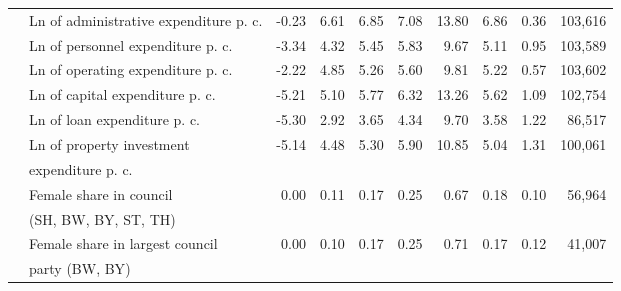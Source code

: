 \begin{tabular}{llrrrrrrrr}
  &Ln of administrative expenditure \acs{p. c.} & -0.23 & 6.61 & 6.85 & 7.08 & 13.80 & 6.86 & 0.36 & 103,616 \\ 
  &Ln of personnel expenditure \acs{p. c.} & -3.34 & 4.32 & 5.45 & 5.83 & 9.67 & 5.11 & 0.95 & 103,589 \\ 
  &Ln of operating expenditure \acs{p. c.} & -2.22 & 4.85 & 5.26 & 5.60 & 9.81 & 5.22 & 0.57 & 103,602 \\ 
  &Ln of capital expenditure \acs{p. c.} & -5.21 & 5.10 & 5.77 & 6.32 & 13.26 & 5.62 & 1.09 & 102,754 \\ 
  &Ln of loan expenditure \acs{p. c.} & -5.30 & 2.92 & 3.65 & 4.34 & 9.70 & 3.58 & 1.22 & 86,517 \\ 
  &Ln of property investment & -5.14 & 4.48 & 5.30 & 5.90 & 10.85 & 5.04 & 1.31 & 100,061 \\ 
  &\hspace{5mm} expenditure \acs{p. c.} &&&&&&&& \\
  &Female share in council  & 0.00 & 0.11 & 0.17 & 0.25 & 0.67 & 0.18 & 0.10 & 56,964 \\ 
  &\hspace{5mm} (\acs{SH}, \acs{BW}, \acs{BY}, \acs{ST}, \acs{TH}) &&&&&&&& \\
  &Female share in largest council  & 0.00 & 0.10 & 0.17 & 0.25 & 0.71 & 0.17 & 0.12 & 41,007 \\ 
  &\hspace{5mm} party (\acs{BW}, \acs{BY}) &&&&&&&& \\
   \midrule \bottomrule
\end{tabular}
